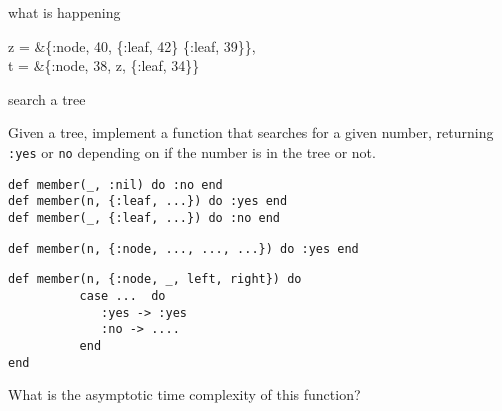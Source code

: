 \begin{frame}{what is happening}

\begin{code}
  z = &\{:node, 40, \{:leaf, 42\} \{:leaf, 39\}\},\\
  t = &\{:node, 38, z, \{:leaf, 34\}\}
\end{code}
\pause \vspace{20pt}


\end{frame}


\begin{frame}[fragile]{search a tree}

Given a tree, implement a function that searches for a given number,
returning {\tt :yes} or {\tt no} depending on if the number is in the
tree or not.

\pause\vspace{20pt}

\begin{verbatim}
def member(_, :nil) do :no end
def member(n, {:leaf, ...}) do :yes end
def member(_, {:leaf, ...}) do :no end
\end{verbatim}
\pause
\begin{verbatim}
def member(n, {:node, ..., ..., ...}) do :yes end
\end{verbatim}
\pause

\begin{verbatim}
def member(n, {:node, _, left, right}) do 
          case ...  do
             :yes -> :yes
             :no -> ....
          end
end
\end{verbatim}

\pause\vspace{10pt}
What is the asymptotic time complexity of this function?
\end{frame}


